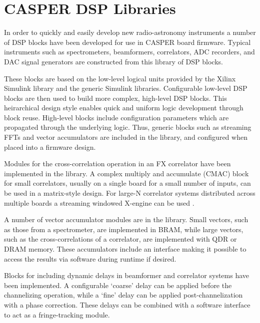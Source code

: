 \documentclass{ws-jai}
\begin{document}
\section{CASPER DSP Libraries} \label{sec:libraries}



In order to quickly and easily develop new radio-astronomy instruments a number
of DSP blocks have been developed for use in CASPER board firmware. Typical
instruments such as spectrometers, beamformers, correlators, ADC recorders, and
DAC signal generators are constructed from this library of DSP blocks.

These blocks are based on the low-level logical units provided by the Xilinx
Simulink library and the generic Simulink libraries. Configurable low-level DSP
blocks are then used to build more complex, high-level DSP blocks. This
heirarchical design style enables quick and uniform logic development through
block reuse. High-level blocks include configuration parameters which are
propagated through the underlying logic. Thus,
generic blocks such as streaming FFTs and vector accumulators are included in
the library, and configured when placed into a firmware design.

Modules for the cross-correlation operation in an FX correlator have been
implemented in the library. A complex multiply and accumulate (CMAC) block for
small correlators, usually on a single board for a small number of inputs, can
be used in a matrix-style design. For large-N correlator systems distributed
across multiple boards a streaming windowed X-engine can be used \citep{parsons2008scalable, hickish14}.

A number of vector accumulator modules are in the library.
Small vectors, such as those from a spectrometer, are implemented in BRAM, while
large vectors, such as the cross-correlations of a correlator, are implemented
with QDR or DRAM memory. These accumulators include an interface making it possible to access
the results via software during runtime if desired.

Blocks for including dynamic delays in beamformer and correlator systems have
been implemented. A configurable `coarse' delay can be applied before the channelizing 
operation, while a `fine' delay can be applied post-channelization with a phase correction.
These delays can be combined with a software interface to act as a fringe-tracking module. 
\end{document}

